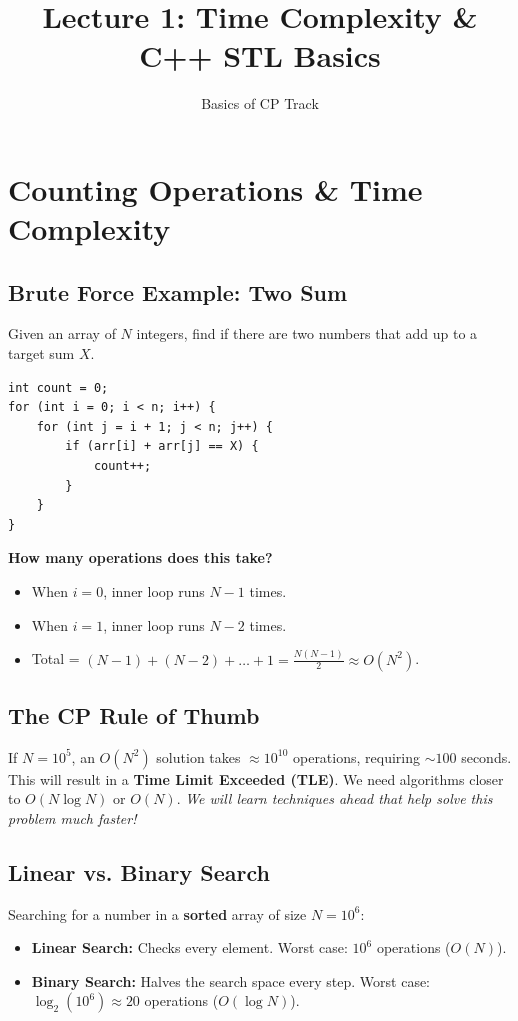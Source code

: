 \documentclass[12pt, a4paper]{article}
\title{\textbf{Lecture 1: Time Complexity \& C++ STL Basics}}
\author{Basics of CP Track}
\date{}
\begin{document}
\maketitle

\section{Counting Operations \& Time Complexity}

\subsection{Brute Force Example: Two Sum}
Given an array of $N$ integers, find if there are two numbers that add up to a target sum $X$.

\begin{lstlisting}
int count = 0;
for (int i = 0; i < n; i++) {
    for (int j = i + 1; j < n; j++) {
        if (arr[i] + arr[j] == X) {
            count++;
        }
    }
}
\end{lstlisting}

\textbf{How many operations does this take?}
\begin{itemize}
    \item When $i = 0$, inner loop runs $N-1$ times.
    \item When $i = 1$, inner loop runs $N-2$ times.
    \item Total = $(N-1) + (N-2) + \dots + 1 = \frac{N(N-1)}{2} \approx O(N^2)$.
\end{itemize}

\subsection{The CP Rule of Thumb}
\begin{center}
\end{center}
If $N = 10^5$, an $O(N^2)$ solution takes $\approx 10^{10}$ operations, requiring $\sim 100$ seconds. This will result in a \textbf{Time Limit Exceeded (TLE)}. We need algorithms closer to $O(N \log N)$ or $O(N)$. \textit{We will learn techniques ahead that help solve this problem much faster!}

\subsection{Linear vs. Binary Search}
Searching for a number in a \textbf{sorted} array of size $N = 10^6$:
\begin{itemize}
    \item \textbf{Linear Search:} Checks every element. Worst case: $10^6$ operations ($O(N)$).
    \item \textbf{Binary Search:} Halves the search space every step. Worst case: $\log_2(10^6) \approx 20$ operations ($O(\log N)$). 
\end{itemize}
\end{document}
